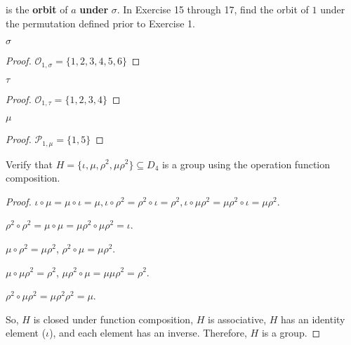 is the \textbf{orbit} of $a$ \textbf{under} $\sigma$. In Exercise 15 through 17, find the orbit of $1$ under the permutation defined prior to Exercise 1.

\newpage
\begin{exercise}
    $\sigma$
\end{exercise}

\begin{proof}
    $\mathcal{O}_{1,\sigma} = \{ 1, 2, 3, 4, 5, 6 \}$
\end{proof}

\newpage
\begin{exercise}
    $\tau$
\end{exercise}

\begin{proof}
    $\mathcal{O}_{1,\tau} = \{ 1, 2, 3, 4 \}$
\end{proof}

\newpage
\begin{exercise}
    $\mu$
\end{exercise}

\begin{proof}
    $\mathcal{P}_{1,\mu} = \{ 1, 5 \}$
\end{proof}

\newpage
\begin{exercise}
    Verify that $H = \{ \iota, \mu, \rho^{2}, \mu\rho^{2} \}\subseteq D_{4}$ is a group using the operation function composition.
\end{exercise}

\begin{proof}
    $\iota\circ\mu = \mu\circ\iota = \mu, \iota\circ\rho^{2} = \rho^{2}\circ\iota = \rho^{2}, \iota\circ\mu\rho^{2} = \mu\rho^{2}\circ\iota = \mu\rho^{2}$.

    $\rho^{2}\circ\rho^{2} = \mu\circ\mu = \mu\rho^{2}\circ\mu\rho^{2} = \iota$.

    $\mu\circ\rho^{2} = \mu\rho^{2}$, $\rho^{2}\circ\mu = \mu\rho^{2}$.

    $\mu\circ\mu\rho^{2} = \rho^{2}$, $\mu\rho^{2}\circ\mu = \mu\mu\rho^{2} = \rho^{2}$.

    $\rho^{2}\circ\mu\rho^{2} = \mu\rho^{2}\rho^{2} = \mu$.

    So, $H$ is closed under function composition, $H$ is associative, $H$ has an identity element ($\iota$), and each element has an inverse. Therefore, $H$ is a group.
\end{proof}

